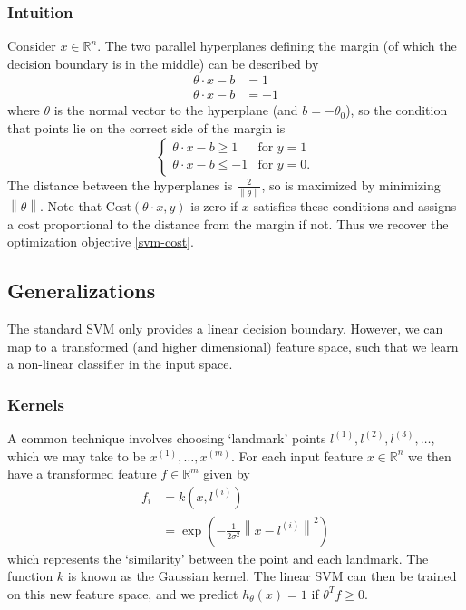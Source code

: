 \documentclass[a4paper,12pt]{article}
\theoremstyle{definition}
\newcommand{\R}{\mathbb{R}}
\newcommand{\norm}[1]{\left\lVert#1\right\rVert}
\begin{document}
\subsubsection{Intuition}
Consider $x \in \R^{n}$. The two parallel hyperplanes defining the margin (of which the decision boundary is in the middle) can be described by
\begin{align*}
\theta \cdot x - b &= 1 \\
\theta \cdot x - b &= -1
\end{align*}
where $\theta$ is the normal vector to the hyperplane (and $b = -\theta_0$), so the condition that points lie on the correct side of the margin is
\[
\begin{cases}
\theta \cdot x - b \ge 1 & \text{for } y = 1 \\
\theta \cdot x - b \le -1 & \text{for } y = 0.
\end{cases}
\]
The distance between the hyperplanes is $\frac{2}{\norm{\theta}}$, so is maximized by minimizing $\norm{\theta}$. Note that $\mathrm{Cost}(\theta \cdot x, y)$ is zero if $x$ satisfies these conditions and assigns a cost proportional to the distance from the margin if not. Thus we recover the optimization objective \eqref{svm-cost}.

\subsection{Generalizations}
The standard SVM only provides a linear decision boundary. However, we can map to a transformed (and higher dimensional) feature space, such that we learn a non-linear classifier in the input space. 

\subsubsection{Kernels}
A common technique involves choosing `landmark' points $l^{(1)}, l^{(2)}, l^{(3)}, \ldots$, which we may take to be $x^{(1)}, \ldots, x^{(m)}$. For each input feature $x \in \R^n$ we then have a transformed feature $f \in \R^m$ given by
\begin{align*}
f_i &= k(x, l^{(i)}) \\
&= \exp{\left( - \frac{1}{2 \sigma^2} \norm{x - l^{(i)}}^2 \right)}
\end{align*}
which represents the `similarity' between the point and each landmark. The function $k$ is known as the Gaussian kernel. The linear SVM can then be trained on this new feature space, and we predict $h_{\theta}(x) = 1$ if $\theta^T f \ge 0$.
\end{document}
